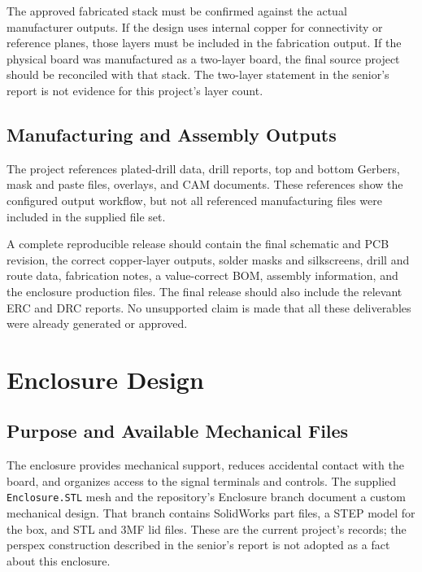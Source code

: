 \documentclass[11pt,a4paper]{article}
\begin{document}
The approved fabricated stack must be confirmed against the actual manufacturer outputs. If the design uses internal copper for connectivity or reference planes, those layers must be included in the fabrication output. If the physical board was manufactured as a two-layer board, the final source project should be reconciled with that stack. The two-layer statement in the senior's report is not evidence for this project's layer count.

\subsection{Manufacturing and Assembly Outputs}
The project references plated-drill data, drill reports, top and bottom Gerbers, mask and paste files, overlays, and CAM documents. These references show the configured output workflow, but not all referenced manufacturing files were included in the supplied file set.

A complete reproducible release should contain the final schematic and PCB revision, the correct copper-layer outputs, solder masks and silkscreens, drill and route data, fabrication notes, a value-correct BOM, assembly information, and the enclosure production files. The final release should also include the relevant ERC and DRC reports. No unsupported claim is made that all these deliverables were already generated or approved.


\section{Enclosure Design}
\subsection{Purpose and Available Mechanical Files}
The enclosure provides mechanical support, reduces accidental contact with the board, and organizes access to the signal terminals and controls. The supplied \texttt{Enclosure.STL} mesh and the repository's Enclosure branch document a custom mechanical design. That branch contains SolidWorks part files, a STEP model for the box, and STL and 3MF lid files. These are the current project's records; the perspex construction described in the senior's report is not adopted as a fact about this enclosure.
\end{document}
